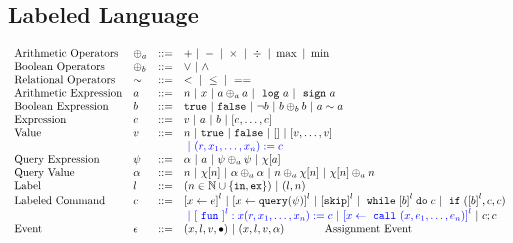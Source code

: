 %
%
\subsection{Labeled Language}
\[
\begin{array}{llll}
\mbox{Arithmetic Operators} 
& \oplus_a & ::= & + ~|~ - ~|~ \times 
%
~|~ \div ~|~ \max ~|~ \min\\  
\mbox{Boolean Operators} 
& \oplus_b & ::= & \lor ~|~ \land
\\
%
\mbox{Relational Operators} 
& \sim & ::= & < ~|~ \leq ~|~ == 
\\  
%
\mbox{Arithmetic Expression} 
& \aexpr & ::= & 
n ~|~ {x} ~|~ \aexpr \oplus_a \aexpr  
 ~|~ \elog \aexpr  ~|~ \esign \aexpr
\\
%
\mbox{Boolean Expression} & \bexpr & ::= & 
%
\etrue ~|~ \efalse  ~|~ \neg \bexpr
 ~|~ \bexpr \oplus_b \bexpr
%
~|~ \aexpr \sim \aexpr 
\\
%
\mbox{Expression} & \expr & ::= & v ~|~ \aexpr ~|~ \bexpr ~|~ [\expr, \dots, \expr]
\\  
%
\mbox{Value} 
& v & ::= & { n ~|~ \etrue ~|~ \efalse ~|~ [] ~|~ [v, \dots, v]}  
\\ 
&&&
\highlight
{
~|~ (r, x_1, \ldots, x_n) := c
}
\\
%
\mbox{Query Expression} 
& {\qexpr} & ::= 
& { \qval ~|~ \aexpr ~|~ \qexpr \oplus_a \qexpr ~|~ \chi[\aexpr]} 
\\
%
\mbox{Query Value} & \qval & ::= 
& {n ~|~ \chi[n] ~|~ \qval \oplus_a  \qval ~|~ n \oplus_a  \chi[n]
    ~|~ \chi[n] \oplus_a  n}
\\
\mbox{Label} 
& l & ::= & (n \in \mathbb{N} \cup \{\lin, \lex\}) ~|~ (l, n)
\\ 
%
\mbox{Labeled Command} 
& {c} & ::= &  
\clabel{\assign{x}{\expr}}^l 
~|~ \clabel{\assign{x}{\query(\qexpr)}}^l
~|~  \clabel{\eskip}^l
~|~ \ewhile \clabel{\bexpr}^{l} \edo {c}
~|~ \eif(\clabel{\bexpr}^{l} , {c}, {c}) 
\\ 
&&&
\highlight
{
~|~ \clabel{\efun}^l: x(r, x_1, \ldots, x_n) := c
~|~ \clabel{\assign{x}{\ecall(x, e_1, \ldots, e_n)}}^l
}
~|~ {c};{c}  
\\ 
\mbox{Event} 
& \event & ::= & 
    ({x}, l, v, \bullet) ~|~ ({x}, l, v, \qval)  ~~~~~~~~~~~ \mbox{Assignment Event} \\

\end{array}\]
